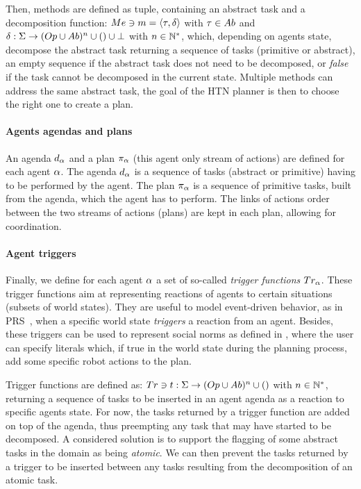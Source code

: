 Then, methods are defined as tuple, containing an abstract task and a decomposition function: $Me \ni m = \langle \tau, \delta \rangle$ with $\tau \in Ab$ and $\delta: \Sigma \rightarrow (Op \cup Ab)^n \cup () \cup \bot$ with $n \in \mathbb{N}^*$, which, depending on agents state, decompose the abstract task returning a sequence of tasks (primitive or abstract), an empty sequence if the abstract task does not need to be decomposed, or \textit{false} if the task cannot be decomposed in the current state. Multiple methods can address the same abstract task, the goal of the HTN planner is then to choose the right one to create a plan.

\paragraph{\bf Agents agendas and plans}
An agenda $d_{\alpha}$ and a plan $\pi_{\alpha}$ (this agent only stream of actions) are defined for each agent $\alpha$. The agenda $d_{\alpha}$ is a sequence of tasks (abstract or primitive) having to be performed by the agent. The plan $\pi_{\alpha}$ is a sequence of primitive tasks, built from the agenda, which the agent has to perform. The links of actions order between the two streams of actions (plans) are kept in each plan, allowing for coordination.

\paragraph{\bf Agent triggers}
Finally, we define for each agent $\alpha$ a set of so-called \textit{trigger functions} $Tr_{\alpha}$. These trigger functions aim at representing reactions of agents to certain situations (subsets of world states). They are useful to model event-driven behavior, as in PRS~\cite{ingrand1996prs}, when a specific world state \textit{triggers} a reaction from an agent. Besides, these triggers can be used to represent social norms as defined in \cite{carlucci2015explicit}, where the user can specify literals which, if true in the world state during the planning process, add some specific robot actions to the plan.

Trigger functions are defined as: $Tr \ni t: \Sigma \rightarrow (Op \cup Ab)^n \cup ()$ with $n \in \mathbb{N}^*$, returning a sequence of tasks to be inserted in an agent agenda as a reaction to specific agents state. For now, the tasks returned by a trigger function are added on top of the agenda, thus preempting any task that may have started to be decomposed. A considered solution is to support the flagging of some abstract tasks in the domain as being \textit{atomic}. We can then prevent the tasks returned by a trigger to be inserted between any tasks resulting from the decomposition of an atomic task.
